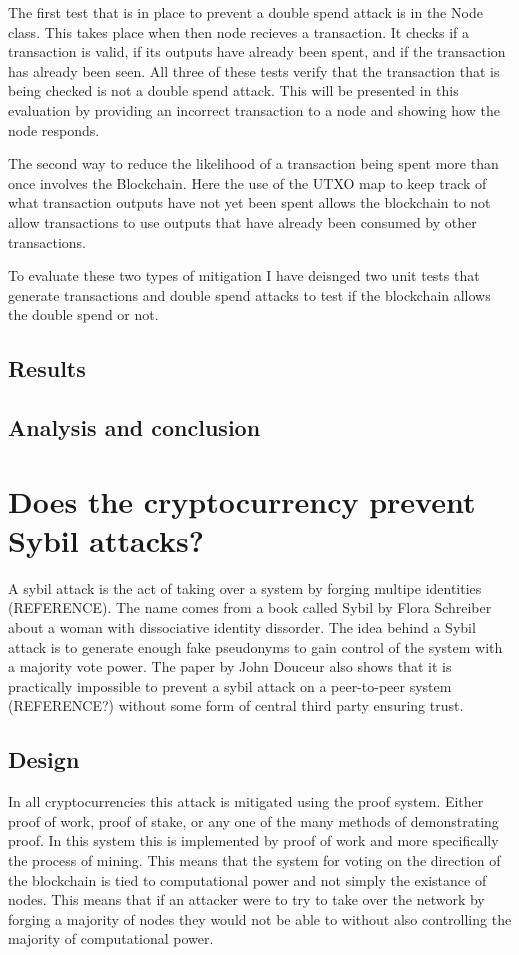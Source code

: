 \documentclass{l4proj}
\begin{document}
The first test that is in place to prevent a double spend attack is in the Node class. This takes place when then node
recieves a transaction. It checks if a transaction is valid, if its outputs have already been spent, and 
if the transaction has already been seen. All three of these tests verify that the transaction that is being checked is
not a double spend attack. This will be presented in this evaluation by providing an incorrect transaction to a node and
showing how the node responds.

The second way to reduce the likelihood of a transaction being spent more than once involves the Blockchain. Here the
use of the UTXO map to keep track of what transaction outputs have not yet been spent allows the blockchain to not allow
transactions to use outputs that have already been consumed by other transactions.

To evaluate these two types of mitigation I have deisnged two unit tests that generate transactions and double spend 
attacks to test if the blockchain allows the double spend or not.

\subsection{Results}
\subsection{Analysis and conclusion}

\section{Does the cryptocurrency prevent Sybil attacks?}
A sybil attack is the act of taking over a system by forging multipe identities (REFERENCE). The name comes from a book
called Sybil by Flora Schreiber about a woman with dissociative identity dissorder. The idea behind a Sybil attack is to 
generate enough fake pseudonyms to gain control of the system with a majority vote power. The paper by John Douceur 
also shows that it is practically impossible to prevent a sybil attack on a peer-to-peer system (REFERENCE?) without some
form of central third party ensuring trust.

\subsection{Design}
In all cryptocurrencies this attack is mitigated using the proof system. Either proof of work, proof of stake, or any one
of the many methods of demonstrating proof. In this system this is implemented by proof of work and more specifically
the process of mining. This means that the system for voting on the direction of the blockchain is tied to computational 
power and not simply the existance of nodes. This means that if an attacker were to try to take over the network by 
forging a majority of nodes they would not be able to without also controlling the majority of computational power.
\end{document}
